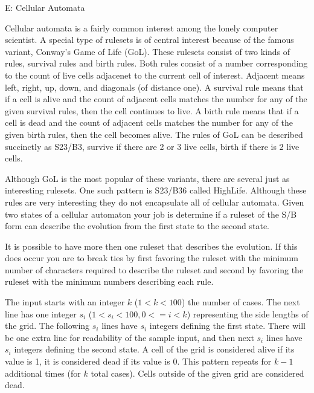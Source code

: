 \begin{problem}{E: Cellular Automata}

Cellular automata is a fairly common interest among the lonely computer scientist.
A special type of rulesets is of central interest because of the famous variant, Conway's Game of Life (GoL).
These rulesets consist of two kinds of rules, survival rules and birth rules.
Both rules consist of a number corresponding to the count of live cells adjacenet to the current cell of interest.
Adjacent means left, right, up, down, and diagonals (of distance one).
A survival rule means that if a cell is alive and the count of adjacent cells matches the number for any of the given survival rules, then the cell continues to live.
A birth rule means that if a cell is dead and the count of adjacent cells matches the number for any of the given birth rules, then the cell becomes alive.
The rules of GoL can be described succinctly as S23/B3, survive if there are 2 or 3 live cells, birth if there is 2 live cells.

Although GoL is the most popular of these variants, there are several just as interesting rulesets.
One such pattern is S23/B36 called HighLife.
Although these rules are very interesting they do not encapsulate all of cellular automata.
Given two states of a cellular automaton your job is determine if a ruleset of the S/B form can describe the evolution from the first state to the second state.

It is possible to have more then one ruleset that describes the evolution.
If this does occur you are to break ties by first favoring the ruleset with the minimum number of characters required to describe the ruleset and second by favoring the ruleset with the minimum numbers describing each rule.
\end{problem}

\begin{formalin}
The input starts with an integer $k$ ($1 < k < 100$) the number of cases.
The next line has one integer $s_i$ ($1 < s_i < 100, 0 <= i < k$) representing the side lengths of the grid.
The following $s_i$ lines have $s_i$ integers defining the first state.
There will be one extra line for readability of the sample input, and then next $s_i$ lines have $s_i$ integers defining the second state.
A cell of the grid is considered alive if its value is 1, it is considered dead if its value is 0.
This pattern repeats for $k-1$ additional times (for $k$ total cases).
Cells outside of the given grid are considered dead.
\end{formalin}

